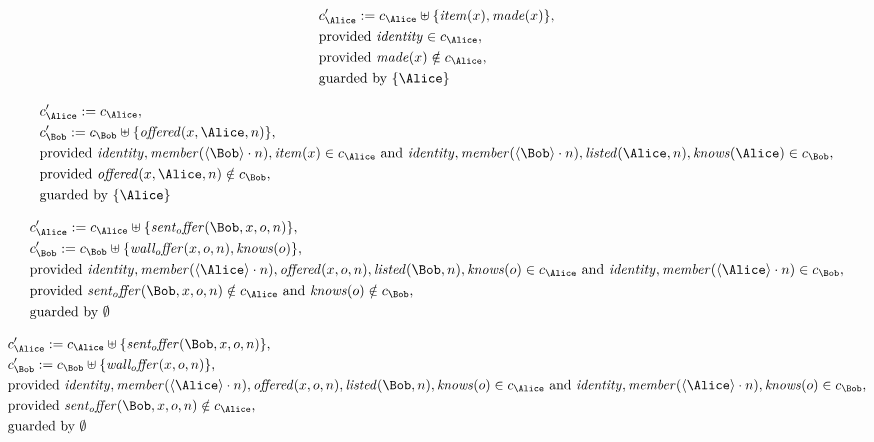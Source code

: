 \begin{align*}
&
c'_
{
\Alice
}
 := 
c_
{
\Alice
}
 \uplus 
\{
\mathit{
item
}
(
x
)
,
\mathit{
made
}
(
x
)
\}
,\\
&
\text{provided } 
\mathit{
identity
}
 \in c_
{
\Alice
}
,\\
&
\text{provided } 
\mathit{
made
}
(
x
)
 \notin c_
{
\Alice
}
,\\
&
\text{guarded by } \{
\Alice
\}
\end{align*}

\begin{align*}
&
c'_
{
\Alice
}
 := 
c_
{
\Alice
}
,\\
&
c'_
{
\Bob
}
 := 
c_
{
\Bob
}
 \uplus 
\{
\mathit{
offered
}
(
x
,
\Alice
,
n
)
\}
,\\
&
\text{provided } 
\mathit{
identity
}
,
\mathit{
member
}
(
\langle
\Bob
\rangle
\cdot
n
)
,
\mathit{
item
}
(
x
)
 \in c_
{
\Alice
}
 \text{ and } 
\mathit{
identity
}
,
\mathit{
member
}
(
\langle
\Bob
\rangle
\cdot
n
)
,
\mathit{
listed
}
(
\Alice
,
n
)
,
\mathit{
knows
}
(
\Alice
)
 \in c_
{
\Bob
}
,\\
&
\text{provided } 
\mathit{
offered
}
(
x
,
\Alice
,
n
)
 \notin c_
{
\Bob
}
,\\
&
\text{guarded by } \{
\Alice
\}
\end{align*}

\begin{align*}
&
c'_
{
\Alice
}
 := 
c_
{
\Alice
}
 \uplus 
\{
\mathit{
sent_offer
}
(
\Bob
,
x
,
o
,
n
)
\}
,\\
&
c'_
{
\Bob
}
 := 
c_
{
\Bob
}
 \uplus 
\{
\mathit{
wall_offer
}
(
x
,
o
,
n
)
,
\mathit{
knows
}
(
o
)
\}
,\\
&
\text{provided } 
\mathit{
identity
}
,
\mathit{
member
}
(
\langle
\Alice
\rangle
\cdot
n
)
,
\mathit{
offered
}
(
x
,
o
,
n
)
,
\mathit{
listed
}
(
\Bob
,
n
)
,
\mathit{
knows
}
(
o
)
 \in c_
{
\Alice
}
 \text{ and } 
\mathit{
identity
}
,
\mathit{
member
}
(
\langle
\Alice
\rangle
\cdot
n
)
 \in c_
{
\Bob
}
,\\
&
\text{provided } 
\mathit{
sent_offer
}
(
\Bob
,
x
,
o
,
n
)
 \notin c_
{
\Alice
}
 \text{ and } 
\mathit{
knows
}
(
o
)
 \notin c_
{
\Bob
}
,\\
&
\text{guarded by } \emptyset
\end{align*}

\begin{align*}
&
c'_
{
\Alice
}
 := 
c_
{
\Alice
}
 \uplus 
\{
\mathit{
sent_offer
}
(
\Bob
,
x
,
o
,
n
)
\}
,\\
&
c'_
{
\Bob
}
 := 
c_
{
\Bob
}
 \uplus 
\{
\mathit{
wall_offer
}
(
x
,
o
,
n
)
\}
,\\
&
\text{provided } 
\mathit{
identity
}
,
\mathit{
member
}
(
\langle
\Alice
\rangle
\cdot
n
)
,
\mathit{
offered
}
(
x
,
o
,
n
)
,
\mathit{
listed
}
(
\Bob
,
n
)
,
\mathit{
knows
}
(
o
)
 \in c_
{
\Alice
}
 \text{ and } 
\mathit{
identity
}
,
\mathit{
member
}
(
\langle
\Alice
\rangle
\cdot
n
)
,
\mathit{
knows
}
(
o
)
 \in c_
{
\Bob
}
,\\
&
\text{provided } 
\mathit{
sent_offer
}
(
\Bob
,
x
,
o
,
n
)
 \notin c_
{
\Alice
}
,\\
&
\text{guarded by } \emptyset
\end{align*}
